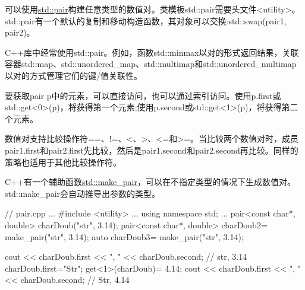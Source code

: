 可以使用\href{http://en.cppreference.com/w/cpp/utility/pair}{std::pair}构建任意类型的数值对。类模板std::pair需要头文件<utility>。std::pair有一个默认的复制和移动构造函数，其对象可以交换:std::swap(pair1, pair2)。

C++库中经常使用std::pair。例如，函数std::minmax以对的形式返回结果，关联容器std::map、std::unordered\_map、std::multimap和std::unordered\_multimap以对的方式管理它们的键/值关联性。

要获取pair p中的元素，可以直接访问，也可以通过索引访问。使用p.first或std::get<0>(p)，将获得第一个元素;使用p.second或std::get<1>(p)，将获得第二个元素。

数值对支持比较操作符==、!=、<、>、<=和>=。当比较两个数值对时，成员pair1.first和pair2.first先比较，然后是pair1.second和pair2.second再比较。同样的策略也适用于其他比较操作符。


C++有一个辅助函数\href{http://en.cppreference.com/w/cpp/utility/pair/make_pair}{std::make\_pair}，可以在不指定类型的情况下生成数值对。std::make\_pair会自动推导出参数的类型。


\begin{cpp}
// pair.cpp
...
#include <utility>
...
using namespace std;
...
pair<const char*, double> charDoub("str", 3.14);
pair<const char*, double> charDoub2= make_pair("str", 3.14);
auto charDoub3= make_pair("str", 3.14);

cout << charDoub.first << ", " << charDoub.second; // str, 3.14
charDoub.first="Str";
get<1>(charDoub)= 4.14;
cout << charDoub.first << ", " << charDoub.second; // Str, 4.14
\end{cpp}
































